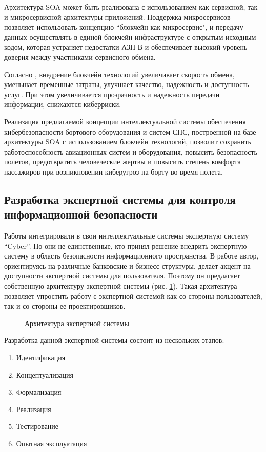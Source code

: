 Архитектура SOA может быть реализована с использованием как сервисной, так и микросервисной архитектуры
приложений. Поддержка микросервисов позволяет использовать концепцию ``блокчейн как микросервис", и передачу
данных осуществлять в единой блокчейн инфраструктуре с открытым исходным кодом, которая устраняет недостатки
АЗН-В \cite{block} и обеспечивает высокий уровень доверия между участниками сервисного обмена.

Согласно \cite{concept}, внедрение блокчейн технологий увеличивает скорость обмена, уменьшает временные затраты, улучшает
качество, надежность и доступность услуг. При этом увеличивается прозрачность и надежность передачи
информации, снижаются киберриски.

Реализация предлагаемой концепции интеллектуальной системы обеспечения кибербезопасности бортового
оборудования и систем СПС, построенной на базе архитектуры SOA с использованием блокчейн технологий,
позволит сохранить работоспособность авиационных систем и оборудования, повысить безопасность полетов,
предотвратить человеческие жертвы и повысить степень комфорта пассажиров при возникновении киберугроз
на борту во время полета.
\subsection{Разработка экспертной системы для контроля информационной безопасности}
Работы \cite{scheme, ontoling} интегрировали в свои интеллектуальные системы экспертную систему ``Cyber''.
Но они не единственные, кто принял решение внедрить экспертную систему в область безопасности информационного
пространства. В работе \cite{idea} автор, ориентируясь на различные банковские и бизнесс структуры, делает акцент на
доступности экспертной системы для пользователя. Поэтому он предлагает собственную архитектуру экспертной системы
(рис. \ref{arch}). Такая архитектура позволяет упростить работу с экспертной системой как со стороны пользователей,
так и со стороны ее проектировщиков.

\begin{figure}[h]
    \caption{Архитектура экспертной системы \cite{idea}}
    \label{arch}
\end{figure}

Разработка данной экспертной системы состоит из нескольких этапов:
\begin{enumerate}
    \item
    Идентификация
    \item
    Концептуализация
    \item
    Формализация
    \item
    Реализация
    \item
    Тестирование
    \item
    Опытная эксплуатация
\end{enumerate}

